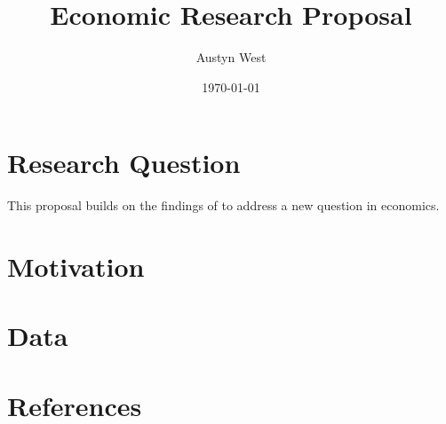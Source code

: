 \documentclass[12pt]{article}
\title{Economic Research Proposal}
\author{Austyn West}
\date{\today}
\begin{document}
\maketitle


\section*{Research Question}
This proposal builds on the findings of \cite{example2020} to address a new question in economics.

\section*{Motivation}

\section*{Data}


\section*{References}
\printbibliography
\end{document}
